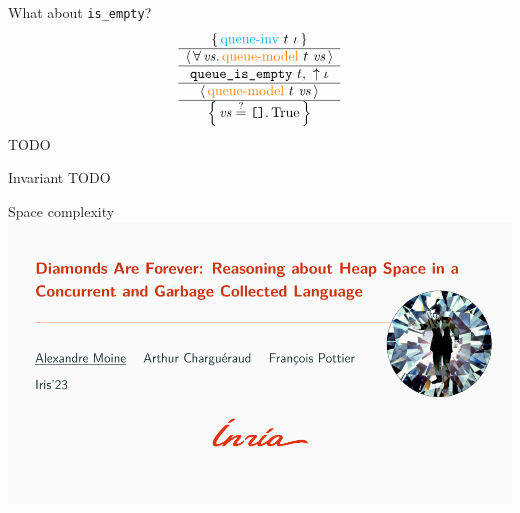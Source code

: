 
\begin{frame}{What about \texttt{is\_empty}?}
\large
\[
  \aspec{
    \mathcolor{cyan}{\mathrm{queue \mathhyphen inv}}\ t\ \iota
  }{
    \mathit{vs}
  }{
    \mathcolor{orange}{\mathrm{queue \mathhyphen model}}\ t\ \mathit{vs}
  }{
    \texttt{queue\_is\_empty}\ t,\ \uparrow \iota
  }{
    \mathcolor{orange}{\mathrm{queue \mathhyphen model}}\ t\ \mathit{vs}
  }{
    \mathit{vs} \stackrel{?}{=} \texttt{[]}
  }{
    \iTrue
  }
\]
\vfill
TODO
\end{frame}


\begin{frame}{\Iris Invariant}
TODO
\end{frame}


\begin{frame}{Space complexity}
\centering
\includegraphics[scale=0.65]{images/moine_2023.pdf}
\end{frame}